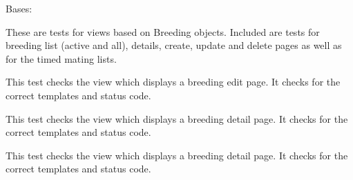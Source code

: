 \documentclass[letterpaper,10pt,english]{sphinxmanual}
\begin{document}
\begin{fulllineitems}
\label{api:animal.tests.BreedingViewTests}
Bases: 


These are tests for views based on Breeding objects.  Included are tests for breeding list (active and all), details, create, update and delete pages as well as for the timed mating lists.


\begin{fulllineitems}
\label{api:animal.tests.BreedingViewTests.setUp}
\end{fulllineitems}


\begin{fulllineitems}
\label{api:animal.tests.BreedingViewTests.tearDown}
\end{fulllineitems}


\begin{fulllineitems}
\label{api:animal.tests.BreedingViewTests.test_breeding_change}
This test checks the view which displays a breeding edit page.  It checks for the correct templates and status code.


\end{fulllineitems}


\begin{fulllineitems}
\label{api:animal.tests.BreedingViewTests.test_breeding_delete}
This test checks the view which displays a breeding detail page.  It checks for the correct templates and status code.


\end{fulllineitems}


\begin{fulllineitems}
\label{api:animal.tests.BreedingViewTests.test_breeding_detail}
This test checks the view which displays a breeding detail page.  It checks for the correct templates and status code.



\end{fulllineitems}
\end{fulllineitems}
\end{document}
